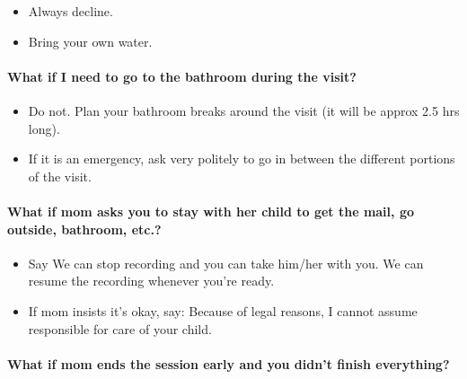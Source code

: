 \documentclass[
]{book}
\providecommand{\tightlist}{%
  \setlength{\itemsep}{0pt}\setlength{\parskip}{0pt}}
\begin{document}
\begin{itemize}
\tightlist
\item
  Always decline.
\item
  Bring your own water.
\end{itemize}

\hypertarget{what-if-i-need-to-go-to-the-bathroom-during-the-visit}{%
\paragraph*{What if I need to go to the bathroom during the visit?}\label{what-if-i-need-to-go-to-the-bathroom-during-the-visit}}

\begin{itemize}
\tightlist
\item
  Do not. Plan your bathroom breaks around the visit (it will be approx 2.5 hrs long).
\item
  If it is an emergency, ask very politely to go in between the different portions of the visit.
\end{itemize}

\hypertarget{what-if-mom-asks-you-to-stay-with-her-child-to-get-the-mail-go-outside-bathroom-etc.}{%
\paragraph*{What if mom asks you to stay with her child to get the mail, go outside, bathroom, etc.?}\label{what-if-mom-asks-you-to-stay-with-her-child-to-get-the-mail-go-outside-bathroom-etc.}}

\begin{itemize}
\tightlist
\item
  Say We can stop recording and you can take him/her with you. We can resume the recording whenever you're ready.
\item
  If mom insists it's okay, say: Because of legal reasons, I cannot assume responsible for care of your child.
\end{itemize}

\hypertarget{what-if-mom-ends-the-session-early-and-you-didnt-finish-everything}{%
\paragraph*{What if mom ends the session early and you didn't finish everything?}\label{what-if-mom-ends-the-session-early-and-you-didnt-finish-everything}}
\end{document}

